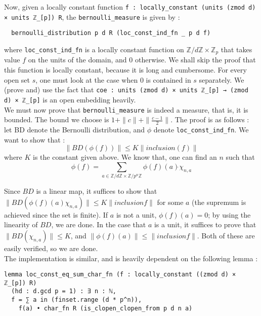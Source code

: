 \documentclass[11pt]{article}
\newcommand{\lean}[1]{\texttt{#1}\xspace} %
\begin{document}
Now, given a locally constant function \lean{f : locally\_constant (units (zmod d) × units ℤ\_[p]) R}, 
the \lean{bernoulli\_measure} is given by : 
\begin{lstlisting}
  bernoulli_distribution p d R (loc_const_ind_fn _ p d f)
\end{lstlisting}
where \lean{loc\_const\_ind\_fn} is a locally constant function on $\mathbb{Z}/d \mathbb{Z} \times \mathbb{Z}_p$ 
that takes value $f$ on the units of the domain, and 0 otherwise. We shall skip the proof that this function is 
locally constant, because it is long and cumbersome. For every open set $s$, one must look at the case when 0 is 
contained in $s$ separately. We (prove and) use the fact that \lean{coe : units (zmod d) × units ℤ\_[p] → (zmod d) × ℤ\_[p]} 
is an open embedding heavily. \\

We must now prove that \lean{bernoulli\_measure} is indeed a measure, that is, it is bounded. The bound we choose is 
$1 + \parallel c \parallel + \parallel \frac{c - 1}{2} \parallel$. The proof is as follows : let BD denote the Bernoulli 
distribution, and $\phi$ denote \lean{loc\_const\_ind\_fn}. We want to show that : 
$$ \parallel BD (\phi (f)) \parallel \le K \parallel inclusion (f) \parallel $$
where $K$ is the constant given above. We know that, one can find an $n$ such that 
$$\phi (f) = \sum_{a \in \mathbb{Z}/d \mathbb{Z} \times \mathbb{Z} /p^n \mathbb{Z}} \phi(f) (a) \dot{} \chi_{n,a}$$

Since $BD$ is a linear map, it suffices to show that 
$\parallel BD (\phi (f)(a) \chi_{n, a}) \parallel \le K \parallel inclusion f \parallel$ for some $a$ (the supremum is achieved 
since the set is finite). If $a$ is not a unit, $\phi (f) (a) = 0$; by using the linearity of $BD$, we are done. 
In the case that $a$ is a unit, it suffices to prove that $\parallel BD(\chi_{n, a}) \parallel \le K$, and 
$\parallel \phi (f) (a) \parallel \le \parallel inclusion f \parallel$. Both of these are easily verified, so we are done. \\

The implementation is similar, and is heavily dependent on the following lemma : 
\begin{lstlisting}
lemma loc_const_eq_sum_char_fn (f : locally_constant ((zmod d) × ℤ_[p]) R) 
  (hd : d.gcd p = 1) : ∃ n : ℕ, 
  f = ∑ a in (finset.range (d * p^n)), 
    f(a) • char_fn R (is_clopen_clopen_from p d n a)
\end{lstlisting}
\end{document}
